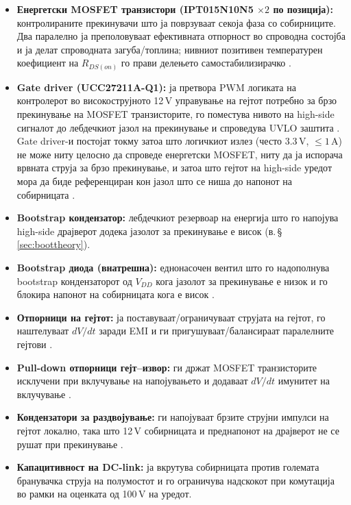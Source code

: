 \documentclass[11pt,a4paper]{article}
\newcommand{\eng}[1]{\textenglish{#1}}
\begin{document}
\begin{itemize}
  \item \textbf{Енергетски MOSFET транзистори (IPT015N10N5 $\times 2$ по позиција):} контролираните прекинувачи што ја поврзуваат секоја фаза со собирниците. Два паралелно ја преполовуваат ефективната отпорност во спроводна состојба и ја делат спроводната загуба/топлина; нивниот позитивен температурен коефициент на $R_{DS(on)}$ го прави делењето самостабилизирачко \cite{ref5}.
  \item \textbf{\eng{Gate driver} (UCC27211A-Q1):} ја претвора PWM логиката на контролерот во високострујното 12\,V управување на гејтот потребно за брзо прекинување на MOSFET транзисторите, го поместува нивото на \eng{high-side} сигналот до лебдечкиот јазол на прекинување и спроведува UVLO заштита \cite{ref3}. \eng{Gate driver}-и постојат токму затоа што логичкиот излез (често 3.3\,V, $\le 1$\,A) не може ниту целосно да спроведе енергетски MOSFET, ниту да ја испорача врвната струја за брзо прекинување, и затоа што гејтот на \eng{high-side} уредот мора да биде референциран кон јазол што се ниша до напонот на собирницата \cite{ref3,ref5}.
  \item \textbf{\eng{Bootstrap} кондензатор:} лебдечкиот резервоар на енергија што го напојува \eng{high-side} драјверот додека јазолот за прекинување е висок (в.\,\S\,\ref{sec:boottheory}).
  \item \textbf{\eng{Bootstrap} диода (внатрешна):} еднонасочен вентил што го надополнува \eng{bootstrap} кондензаторот од $V_{DD}$ кога јазолот за прекинување е низок и го блокира напонот на собирницата кога е висок \cite{ref3,ref6}.
  \item \textbf{Отпорници на гејтот:} ја поставуваат/ограничуваат струјата на гејтот, го наштелуваат $dV/dt$ заради EMI и ги пригушуваат/балансираат паралелните гејтови \cite{ref5}.
  \item \textbf{\eng{Pull-down} отпорници гејт--извор:} ги држат MOSFET транзисторите исклучени при вклучување на напојувањето и додаваат $dV/dt$ имунитет на вклучување \cite{ref5}.
  \item \textbf{Кондензатори за раздвојување:} ги напојуваат брзите струјни импулси на гејтот локално, така што 12\,V собирницата и преднапонот на драјверот не се рушат при прекинување \cite{ref3}.
  \item \textbf{Капацитивност на DC-link:} ја вкрутува собирницата против големата бранувачка струја на полумостот и го ограничува надскокот при комутација во рамки на оценката од 100\,V на уредот.
\end{itemize}
\end{document}
